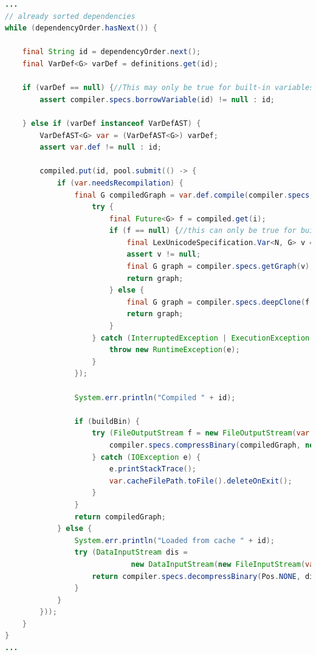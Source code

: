 \begin{lstlisting}[language=Java, frame=single]
...
// already sorted dependencies
while (dependencyOrder.hasNext()) {

    final String id = dependencyOrder.next();
    final VarDef<G> varDef = definitions.get(id);

    if (varDef == null) {//This may only be true for built-in variables
        assert compiler.specs.borrowVariable(id) != null : id;

    } else if (varDef instanceof VarDefAST) {
        VarDefAST<G> var = (VarDefAST<G>) varDef;
        assert var.def != null : id;

        compiled.put(id, pool.submit(() -> {
            if (var.needsRecompilation) {
                final G compiledGraph = var.def.compile(compiler.specs, i -> {
                    try {
                        final Future<G> f = compiled.get(i);
                        if (f == null) {//this can only be true for built-in variables
                            final LexUnicodeSpecification.Var<N, G> v = compiler.specs.copyVariable(i);
                            assert v != null;
                            final G graph = compiler.specs.getGraph(v);
                            return graph;
                        } else {
                            final G graph = compiler.specs.deepClone(f.get());
                            return graph;
                        }
                    } catch (InterruptedException | ExecutionException e) {
                        throw new RuntimeException(e);
                    }
                });

                System.err.println("Compiled " + id);

                if (buildBin) {
                    try (FileOutputStream f = new FileOutputStream(var.cacheFilePath.toFile())) {
                        compiler.specs.compressBinary(compiledGraph, new DataOutputStream(f));
                    } catch (IOException e) {
                        e.printStackTrace();
                        var.cacheFilePath.toFile().deleteOnExit();
                    }
                }
                return compiledGraph;
            } else {
                System.err.println("Loaded from cache " + id);
                try (DataInputStream dis =
                             new DataInputStream(new FileInputStream(var.cacheFilePath.toFile()))) {
                    return compiler.specs.decompressBinary(Pos.NONE, dis);
                }
            }
        }));
    }
}
...
\end{lstlisting}

